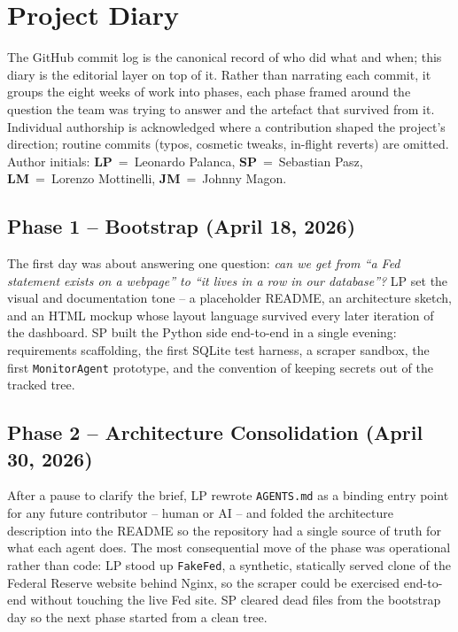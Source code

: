\section{Project Diary}

The GitHub commit log is the canonical record of who did what and when; this diary is the editorial layer on top of it. Rather than narrating each commit, it groups the eight weeks of work into phases, each phase framed around the question the team was trying to answer and the artefact that survived from it. Individual authorship is acknowledged where a contribution shaped the project's direction; routine commits (typos, cosmetic tweaks, in-flight reverts) are omitted. Author initials: \textbf{LP}~=~Leonardo Palanca, \textbf{SP}~=~Sebastian Pasz, \textbf{LM}~=~Lorenzo Mottinelli, \textbf{JM}~=~Johnny Magon.

\subsection{Phase 1 -- Bootstrap (April 18, 2026)}
The first day was about answering one question: \emph{can we get from ``a Fed statement exists on a webpage'' to ``it lives in a row in our database''?} LP set the visual and documentation tone -- a placeholder README, an architecture sketch, and an HTML mockup whose layout language survived every later iteration of the dashboard. SP built the Python side end-to-end in a single evening: requirements scaffolding, the first SQLite test harness, a scraper sandbox, the first \texttt{MonitorAgent} prototype, and the convention of keeping secrets out of the tracked tree.

\subsection{Phase 2 -- Architecture Consolidation (April 30, 2026)}
After a pause to clarify the brief, LP rewrote \texttt{AGENTS.md} as a binding entry point for any future contributor -- human or AI -- and folded the architecture description into the README so the repository had a single source of truth for what each agent does. The most consequential move of the phase was operational rather than code: LP stood up \texttt{FakeFed}, a synthetic, statically served clone of the Federal Reserve website behind Nginx, so the scraper could be exercised end-to-end without touching the live Fed site. SP cleared dead files from the bootstrap day so the next phase started from a clean tree.

